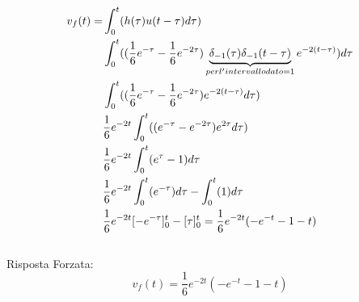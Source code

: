 		\[
		\begin{split}
		v_f(t)=&\int_{0}^{t}(h(\tau)u(t-\tau)d\tau)\\
		&\int_{0}^{t}((\frac{1}{6}e^{-\tau}-\frac{1}{6}e^{-2\tau})\underbrace{\delta_{-1}(\tau)\delta_{-1}(t-\tau)}_{per l'intervallo dato = 1}e^{-2(t-\tau)})d\tau\\
		&\int_{0}^{t}((\frac{1}{6}e^{-\tau}-\frac{1}{6}e^{-2\tau})e^{-2(t-\tau)}d\tau)\\
		&\frac{1}{6}e^{-2t}\int_{0}^{t}((e^{-\tau}-e^{-2\tau})e^{2\tau}d\tau)\\
		&\frac{1}{6}e^{-2t}\int_{0}^{t}(e^{\tau}-1)d\tau\\
		&\frac{1}{6}e^{-2t}\int_{0}^{t}(e^{-\tau})d\tau-\int_{0}^{t}(1)d\tau\\
		&\frac{1}{6}e^{-2t}[-e^{-\tau}]_0^t-[\tau]_0^t = \frac{1}{6}e^{-2t}(-e^{-t}-1-t)
		\\
		\end{split}
		\]
		\\
		Risposta Forzata:
		\[
		v_f(t) = \frac{1}{6}e^{-2t}(-e^{-t}-1-t)
		\]
		\newpage
